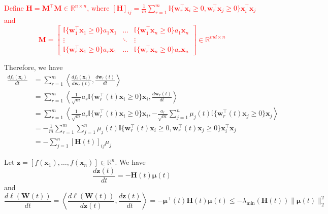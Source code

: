 \textcolor{red}{
Define $\mathbf{H} = \mathbf{M}^\top \mathbf{M} \in \mathbb{R}^{n\times n}$, where $[\mathbf{H}]_{ij} = \frac{1}{m} \sum_{r=1}^m \mathbb{I}\{\mathbf{w}_r^\top \mathbf{x}_i \geq 0, \mathbf{w}_r^\top \mathbf{x}_j \geq 0\} \mathbf{x}_i^\top \mathbf{x}_j$ and
\begin{equation}
    \mathbf{M} = \begin{bmatrix}
\mathbb{I}\{\mathbf{w}_1^\top \mathbf{x}_1 \geq 0\} a_1 \mathbf{x}_1& \ldots & \mathbb{I}\{\mathbf{w}_1^\top \mathbf{x}_n \geq 0\} a_1 \mathbf{x}_n\\ 
\vdots & \ddots  & \vdots \\ 
\mathbb{I}\{\mathbf{w}_r^\top \mathbf{x}_1 \geq 0\} a_r \mathbf{x}_1 & \ldots & \mathbb{I}\{\mathbf{w}_r^\top \mathbf{x}_n \geq 0\} a_r \mathbf{x}_n 
\end{bmatrix} 
\in \mathbb{R}^{md\times n}
\end{equation}
}


Therefore, we have
\begin{equation}
    \begin{aligned}
    \frac{d f_t(\mathbf{x}_i)}{dt} &= \sum_{r=1}^m
    \left\langle  \frac{d f_t(\mathbf{x}_i)}{d\mathbf{w}_r(t)}, \frac{d\mathbf{w}_r(t)}{dt} \right\rangle \\
    &= \sum_{r=1}^m \left\langle \frac{1}{\sqrt{m}} a_r \mathbb{I}\{\mathbf{w}_r^\top(t) \mathbf{x}_i \geq 0\} \mathbf{x}_i, \frac{d \mathbf{w}_r(t)}{dt}\right\rangle \\
    &=  \sum_{r=1}^m \left\langle \frac{1}{\sqrt{m}} a_r \mathbb{I}\{\mathbf{w}_r^\top(t) \mathbf{x}_i \geq 0\} \mathbf{x}_i, - \frac{a_r}{\sqrt{m}}\sum_{j=1}^n \mu_j(t) \mathbb{I}\{\mathbf{w}_r^\top(t) \mathbf{x}_j \geq 0\} \mathbf{x}_j \right\rangle \\
    &=  - \frac{1}{m} \sum_{r=1}^m  \sum_{j=1}^n \mu_j(t) \mathbb{I}\{\mathbf{w}_r^\top(t) \mathbf{x}_i \geq 0, \mathbf{w}_r^\top(t) \mathbf{x}_j \geq 0\} \mathbf{x}_i^\top \mathbf{x}_j  \\
    &= - \sum_{j=1}^n [\mathbf{H}(t)]_{ij} \mu_j
    \end{aligned}
\end{equation}

Let $\mathbf{z} = [f(\mathbf{x}_1), \ldots, f(\mathbf{x}_n)] \in \mathbb{R}^n $. We have
\begin{equation}
    \frac{d \mathbf{z}(t)}{dt} = - \mathbf{H}(t) \bm{\mu} (t) 
\end{equation}
and
\begin{equation}
    \frac{d \ell(\mathbf{W}(t))}{ dt} = \left\langle \frac{d \ell(\mathbf{W}(t))}{d \mathbf{z}(t)}, \frac{d \mathbf{z}(t)}{dt} \right\rangle  = - \bm{\mu}^\top (t) \mathbf{H}(t) \bm{\mu}(t) \leq - \lambda_{\min}(\mathbf{H}(t)) \| \bm{\mu}(t) \|_2^2
\end{equation}


\clearpage